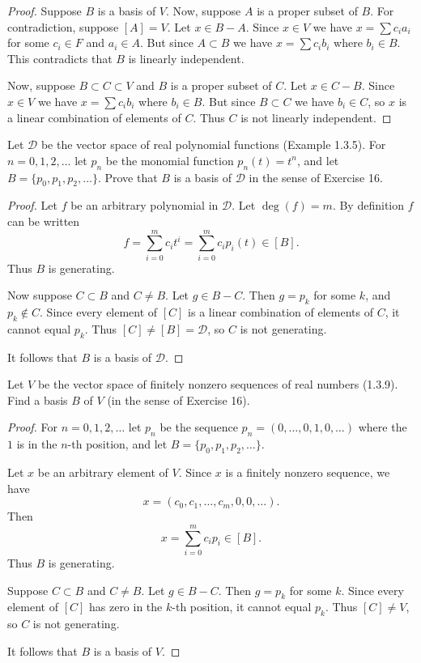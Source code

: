 \begin{proof}
    Suppose $B$ is a basis of $V$.
    Now, suppose $A$ is a proper subset of $B$.
    For contradiction, suppose $[A] = V$.
    Let $x \in B - A$. Since $x \in V$ we have $x = \sum c_i a_i$
    for some $c_i \in F$ and $a_i \in A$.
    But since $A \subset B$ we have $x = \sum c_i b_i$ where $b_i \in B$.
    This contradicts that $B$ is linearly independent.

    Now, suppose $B \subset C \subset V$ and $B$ is a proper subset of $C$.
    Let $x \in C - B$. Since $x \in V$ we have $x = \sum c_i b_i$ where $b_i \in B$.
    But since $B \subset C$ we have $b_i \in C$, so $x$ is a linear combination of elements of $C$.
    Thus $C$ is not linearly independent.
\end{proof}


\begin{tcolorbox}[title=Problem 18, breakable]
    Let $\mathcal{D}$ be the vector space of real polynomial functions (Example 1.3.5).
    For $n = 0, 1, 2, \ldots$ let $p_n$ be the monomial function 
    $p_n(t) = t^n$, and let $B = \{p_0, p_1, p_2, \ldots\}$. Prove that $B$ 
    is a basis of $\mathcal{D}$ in the sense of Exercise 16.
\end{tcolorbox}

\begin{proof}
    Let $f$ be an arbitrary polynomial in $\mathcal{D}$.
    Let $\deg(f) = m$. By definition $f$ can be written 
    \[f = \sum_{i=0}^m c_i t^i = \sum_{i=0}^m c_i p_i(t) \in [B].\]
    Thus $B$ is generating.

    Now suppose $C \subset B$ and $C \ne B$.
    Let $g \in B - C$. Then $g = p_k$ for some $k$, and $p_k \notin C$.
    Since every element of $[C]$ is a linear combination of elements of $C$,
    it cannot equal $p_k$. Thus $[C] \ne [B] = \mathcal{D}$, so $C$ is not generating.

    It follows that $B$ is a basis of $\mathcal{D}$.
\end{proof}

\begin{tcolorbox}[title=Problem 19, breakable]
    Let $V$ be the vector space of finitely nonzero 
    sequences of real numbers (1.3.9). Find a 
    basis $B$ of $V$ (in the sense of Exercise 16).
\end{tcolorbox}

\begin{proof}
    For $n = 0, 1, 2, \ldots$ let $p_n$ be the sequence
        $p_n = (0, \ldots, 0, 1, 0, \ldots)$ where the $1$ is in the $n$-th position, and let 
        $B = \{p_0, p_1, p_2, \ldots\}$.

    Let $x$ be an arbitrary element of $V$. Since $x$ is a finitely nonzero sequence, we have
    \[x = (c_0, c_1, \ldots, c_m, 0, 0, \ldots).\]
    Then
    \[x = \sum_{i=0}^m c_i p_i \in [B].\]
    Thus $B$ is generating.

    Suppose $C \subset B$ and $C \ne B$.
    Let $g \in B - C$. Then $g = p_k$ for some $k$.
    Since every element of $[C]$ has zero in the $k$-th position,
    it cannot equal $p_k$. Thus $[C] \ne V$, so $C$ is not generating.

    It follows that $B$ is a basis of $V$.
\end{proof}


